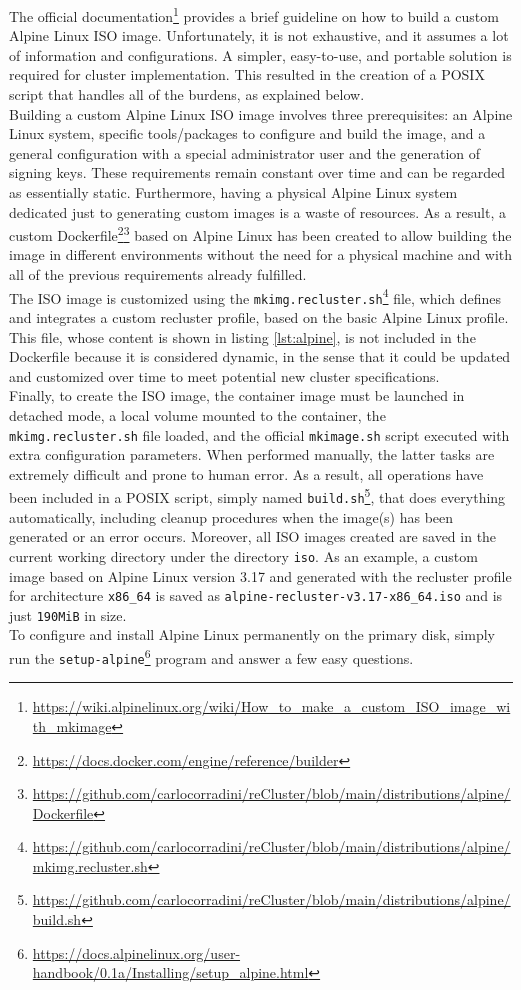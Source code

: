 The official documentation\footnote{\url{https://wiki.alpinelinux.org/wiki/How_to_make_a_custom_ISO_image_with_mkimage}}
provides a brief guideline on how to build a custom Alpine Linux ISO image. Unfortunately,
it is not exhaustive, and it assumes a lot of information and configurations. A
simpler, easy-to-use, and portable solution is required for cluster
implementation. This resulted in the creation of a POSIX script that handles all
of the burdens, as explained below. \\ %
Building a custom Alpine Linux ISO image involves three prerequisites: an Alpine
Linux system, specific tools/packages to configure and build the image, and a general
configuration with a special administrator user and the generation of signing keys.
These requirements remain constant over time and can be regarded as essentially
static. Furthermore, having a physical Alpine Linux system dedicated just to
generating custom images is a waste of resources. As a result, a custom
Dockerfile\footnote{\url{https://docs.docker.com/engine/reference/builder}}\footnote{\url{https://github.com/carlocorradini/reCluster/blob/main/distributions/alpine/Dockerfile}}
based on Alpine Linux has been created to allow building the image in different
environments without the need for a physical machine and with all of the
previous requirements already fulfilled. \\ %
The ISO image is customized using the \texttt{mkimg.recluster.sh}\footnote{\url{https://github.com/carlocorradini/reCluster/blob/main/distributions/alpine/mkimg.recluster.sh}}
file, which defines and integrates a custom recluster profile, based on the basic
Alpine Linux profile. This file, whose content is shown in listing \ref{lst:alpine},
is not included in the Dockerfile because it is considered dynamic, in the sense
that it could be updated and customized over time to meet potential new cluster specifications.
\\ %
Finally, to create the ISO image, the container image must be launched in detached
mode, a local volume mounted to the container, the \texttt{mkimg.recluster.sh}
file loaded, and the official \texttt{mkimage.sh} script executed with extra
configuration parameters. When performed manually, the latter tasks are
extremely difficult and prone to human error. As a result, all operations have
been included in a POSIX script, simply named \texttt{build.sh}\footnote{\url{https://github.com/carlocorradini/reCluster/blob/main/distributions/alpine/build.sh}},
that does everything automatically, including cleanup procedures when the image(s)
has been generated or an error occurs. Moreover, all ISO images created are saved
in the current working directory under the directory \texttt{iso}. As an example,
a custom image based on Alpine Linux version 3.17 and generated with the
recluster profile for architecture \texttt{x86\_64} is saved as \texttt{alpine-recluster-v3.17-x86\_64.iso}
and is just \texttt{190MiB} in size. \\ %
To configure and install Alpine Linux permanently on the primary disk, simply
run the \texttt{setup-alpine}\footnote{\url{https://docs.alpinelinux.org/user-handbook/0.1a/Installing/setup_alpine.html}}
program and answer a few easy questions.


